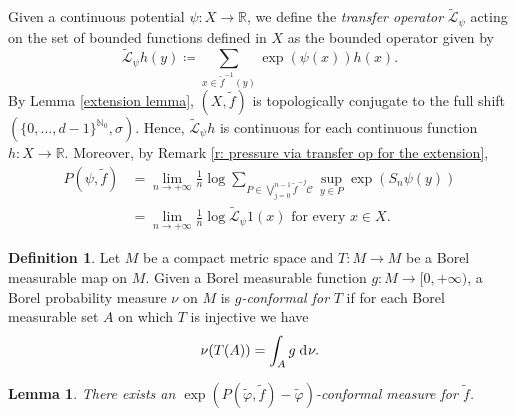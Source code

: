 \documentclass[12pt]{amsart}
\numberwithin{equation}{section} %
\numberwithin{figure}{section} %
\theoremstyle{plain}
\newtheorem{lemm}[prop]{Lemma}
\theoremstyle{definition}
\newtheorem{defi}[prop]{Definition}
\theoremstyle{remark}
\theoremstyle{citing}
\newcommand{\N}{\mathbb{N}}
\newcommand{\R}{\mathbb{R}}
\renewcommand{\=}{\coloneqq}
\newcommand{\dd}{\hspace{1pt}\operatorname{d}\hspace{-1pt}}
\begin{document}
Given a continuous potential $\psi: X\to \R$, we define the \emph{transfer operator} $\widetilde{\mathcal{L}}_{\psi}$ acting on the set of bounded functions defined in $X$ as the bounded operator given by 
\begin{equation}\label{transfer operator}
   \widetilde{\mathcal{L}}_{\psi}h(y) \= \sum_{x\in \widetilde f^{-1}(y)} \exp(\psi(x)) h(x).
\end{equation}
By Lemma \ref{extension lemma}, $(X,\widetilde{f})$ is topologically conjugate to the full shift $(\{0,\dots,d-1\}^{\N_0},\sigma)$. Hence, $\widetilde{\mathcal{L}}_{\psi}h$ is continuous for each continuous function $h:X\to \R$. Moreover, by Remark \ref{r: pressure via transfer op for the extension},
\begin{equation}\label{e: pressure via transfer operator}
\begin{split}
    P(\psi,\widetilde{f}) &= \lim_{n\to+\infty}\frac{1}{n}\log\sum_{P\in \bigvee_{j=0}^{n-1}\widetilde{f}^{-j}\mathcal C} \sup_{y\in P} \exp(S_n\psi(y)) \\
    &= \lim_{n\to+\infty}\frac{1}{n}\log \widetilde{\mathcal{L}}_{\psi}1(x) \text{ for every } x\in X.
    \end{split}
\end{equation}
\begin{defi}\label{defi conformal measure 2}
   Let $M$ be a compact metric space and $T: M \to M$ be a Borel measurable map on $M$. Given a Borel measurable function $g: M\to [0,+\infty)$, a Borel probability measure $\nu$ on $M$ is $g$\emph{-conformal for} $T$ if for each Borel measurable set $A$ on which $T$ is injective we have
 \begin{equation*}
  \nu(T(A)) = \int_A g\dd\nu.
\end{equation*}
\end{defi}
\begin{lemm}\label{lemm existence conformal measure}
There exists an $\exp(P(\widetilde\varphi,\widetilde{f}) - \widetilde\varphi)$-conformal measure for $\widetilde{f}$.
\end{lemm}
\end{document}

